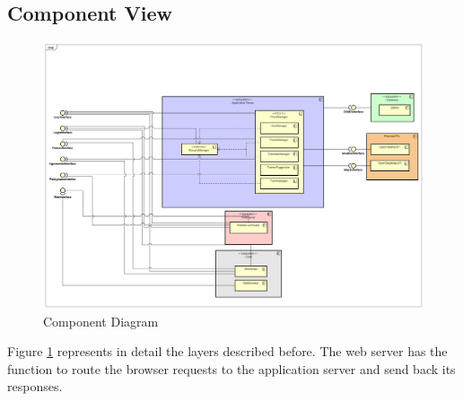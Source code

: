 \subsection{Component View}
\begin{figure}[H]
    \includegraphics[width=\textwidth,height=\textheight,keepaspectratio]{Images/ComponentDiagram.png}
    \caption{Component Diagram}
    \label{fig:component_diagram}
\end{figure}

Figure \ref{fig:component_diagram}  represents in detail the layers described before. The web server has the function to
route the browser requests to the application server and send back its responses.

